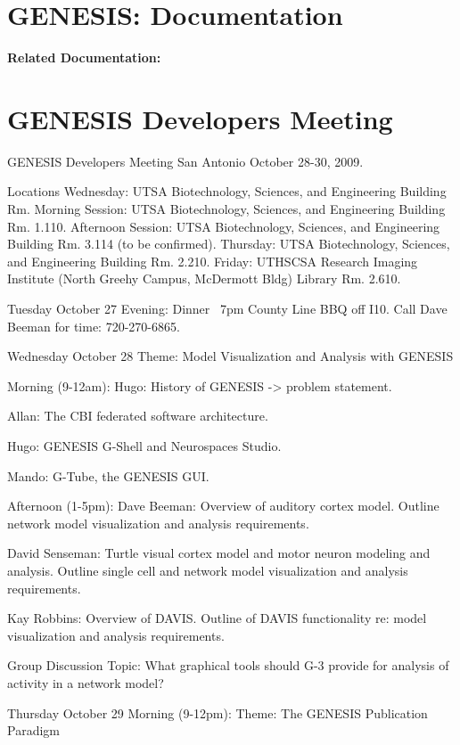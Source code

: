 \documentclass[12pt]{article}
\begin{document}
\section*{GENESIS: Documentation}

{\bf Related Documentation:}

\section*{GENESIS Developers Meeting}

GENESIS Developers Meeting
San Antonio October 28-30, 2009.

Locations
Wednesday: UTSA Biotechnology, Sciences, and Engineering Building Rm. 
Morning Session: UTSA Biotechnology, Sciences, and Engineering Building Rm. 1.110.
Afternoon Session: UTSA Biotechnology, Sciences, and Engineering Building Rm. 3.114 (to be confirmed).
Thursday: UTSA Biotechnology, Sciences, and Engineering Building Rm. 2.210.
Friday: UTHSCSA Research Imaging Institute (North Greehy Campus, McDermott Bldg) Library Rm. 2.610.

Tuesday October 27
Evening: Dinner ~7pm County Line BBQ off I10.
Call Dave Beeman for time: 720-270-6865.

Wednesday October 28
Theme: Model Visualization and Analysis with GENESIS

Morning (9-12am):
Hugo: History of GENESIS -> problem statement.

Allan: The CBI federated software architecture.

Hugo: GENESIS G-Shell and Neurospaces Studio.

Mando: G-Tube, the GENESIS GUI.

Afternoon (1-5pm):
Dave Beeman: Overview of auditory cortex model.
Outline network model visualization and analysis requirements.

David Senseman: Turtle visual cortex model and motor neuron modeling and analysis.
Outline single cell and network model visualization and analysis requirements.

Kay Robbins: Overview of DAVIS.
Outline of DAVIS functionality re: model visualization and analysis requirements.

Group Discussion
Topic: What graphical tools should G-3 provide for analysis of activity in a network model?

Thursday October 29
Morning (9-12pm):
Theme: The GENESIS Publication Paradigm
\end{document}

